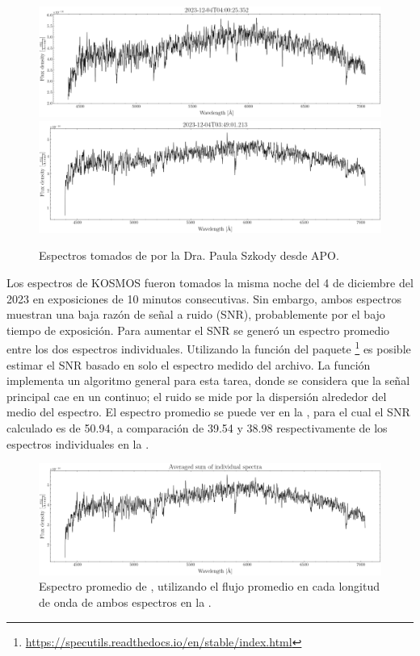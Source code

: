 \begin{figure}[!ht]
    \centering
    \includegraphics[scale=0.45]{Conclusion/Figures/Figura APO Spectrum 2.png}
    \includegraphics[scale=0.45]{Conclusion/Figures/Figura APO Spectrum 1.png}
    \caption{Espectros tomados de \atoObjId por la Dra. Paula Szkody desde APO.}
    \label{figuraEspectrosApo}
\end{figure}

Los espectros de KOSMOS fueron tomados la misma noche del 4 de diciembre del
2023 en exposiciones de 10 minutos consecutivas. Sin embargo, ambos espectros
muestran una baja razón de señal a ruido (SNR), probablemente por el bajo tiempo
de exposición. Para aumentar el SNR se generó un espectro promedio entre los dos
espectros individuales. Utilizando la función  del paquete
\footnote{\url{https://specutils.readthedocs.io/en/stable/index.html}}
es posible estimar el SNR basado en solo el espectro medido del archivo. La
función  implementa un algoritmo general para esta tarea,
donde se considera que la señal principal cae en un continuo; el ruido se mide
por la dispersión alrededor del medio del espectro. El espectro promedio se
puede ver en la , para el cual el SNR
calculado es de 50.94, a comparación de 39.54 y 38.98 respectivamente de los
espectros individuales en la .

\begin{figure}[!ht]
    \centering
    \includegraphics[scale=0.45]{Conclusion/Figures/Figura APO Spectrum Average.png}
    \caption{Espectro promedio de \atoObjIdNoSpace, utilizando el flujo promedio en cada longitud de onda de ambos espectros en la .}
    \label{figuraEspectroApoPromedio}
\end{figure}

